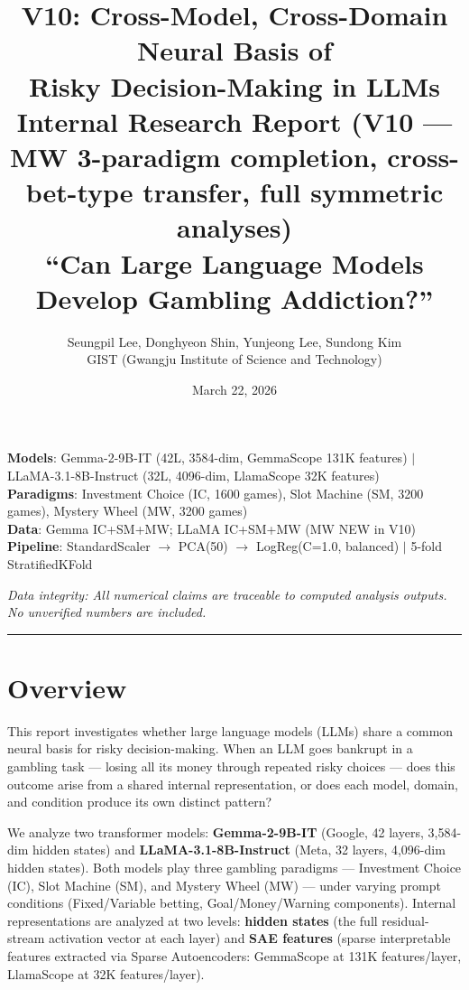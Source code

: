 \documentclass[11pt,a4paper]{article}
\title{\textbf{V10: Cross-Model, Cross-Domain Neural Basis of\\Risky Decision-Making in LLMs}\\[0.5em]
\large Internal Research Report (V10 --- MW 3-paradigm completion, cross-bet-type transfer, full symmetric analyses)\\[0.3em]
\normalsize ``Can Large Language Models Develop Gambling Addiction?''}
\author{Seungpil Lee, Donghyeon Shin, Yunjeong Lee, Sundong Kim\\
\small GIST (Gwangju Institute of Science and Technology)}
\date{March 22, 2026}
\begin{document}
\maketitle
\tableofcontents
\newpage

\noindent\textbf{Models}: Gemma-2-9B-IT (42L, 3584-dim, GemmaScope 131K features) $|$ LLaMA-3.1-8B-Instruct (32L, 4096-dim, LlamaScope 32K features)\\
\textbf{Paradigms}: Investment Choice (IC, 1600 games), Slot Machine (SM, 3200 games), Mystery Wheel (MW, 3200 games)\\
\textbf{Data}: Gemma IC+SM+MW; LLaMA IC+SM+MW (MW NEW in V10)\\
\textbf{Pipeline}: StandardScaler $\rightarrow$ PCA(50) $\rightarrow$ LogReg(C=1.0, balanced) $|$ 5-fold StratifiedKFold

\medskip\noindent\textit{Data integrity: All numerical claims are traceable to computed analysis outputs. No unverified numbers are included.}

\bigskip\hrule\bigskip

\section*{Overview}

This report investigates whether large language models (LLMs) share a common neural basis for risky decision-making. When an LLM goes bankrupt in a gambling task --- losing all its money through repeated risky choices --- does this outcome arise from a shared internal representation, or does each model, domain, and condition produce its own distinct pattern?

\medskip\noindent We analyze two transformer models: \textbf{Gemma-2-9B-IT} (Google, 42 layers, 3,584-dim hidden states) and \textbf{LLaMA-3.1-8B-Instruct} (Meta, 32 layers, 4,096-dim hidden states). Both models play three gambling paradigms --- Investment Choice (IC), Slot Machine (SM), and Mystery Wheel (MW) --- under varying prompt conditions (Fixed/Variable betting, Goal/Money/Warning components). Internal representations are analyzed at two levels: \textbf{hidden states} (the full residual-stream activation vector at each layer) and \textbf{SAE features} (sparse interpretable features extracted via Sparse Autoencoders: GemmaScope at 131K features/layer, LlamaScope at 32K features/layer).
\end{document}
